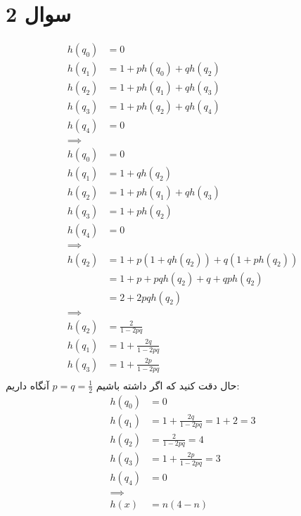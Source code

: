 \section*{سوال 2}
\begin{align*}
    h(q_0) &= 0\\
    h(q_1) &= 1 + p h(q_0) + q h(q_2)\\
    h(q_2) &= 1 + p h(q_1) + q h(q_3)\\
    h(q_3) &= 1 + p h(q_2) + q h(q_4)\\
    h(q_4) &= 0\\
    \implies\\
    h(q_0) &= 0\\
    h(q_1) &= 1 + q h(q_2)\\
    h(q_2) &= 1 + p h(q_1) + q h(q_3)\\
    h(q_3) &= 1 + p h(q_2)\\
    h(q_4) &= 0\\
    \implies\\
    h(q_2) &= 1 + p (1 + q h(q_2)) + q (1 + p h(q_2))\\
    &= 1 + p + pq h(q_2) + q + qp h(q_2)\\
    &= 2 + 2 pq h(q_2)\\
    \implies\\
    h(q_2) &= \frac{2}{1 - 2pq}\\
    h(q_1) &= 1 + \frac{2q}{1 - 2pq}\\
    h(q_3) &= 1 + \frac{2p}{1 - 2pq}\\
\end{align*}
حال دقت کنید که اگر داشته باشیم
$p = q = \frac{1}{2}$
آنگاه داریم:
\begin{align*}
    h(q_0) &= 0\\
    h(q_1) &= 1 + \frac{2q}{1 - 2pq} = 1 + 2 = 3\\
    h(q_2) &= \frac{2}{1 - 2pq} = 4\\
    h(q_3) &= 1 + \frac{2p}{1 - 2pq} = 3\\
    h(q_4) &= 0\\
    \implies\\
    h(x) &= n(4 - n)
\end{align*}